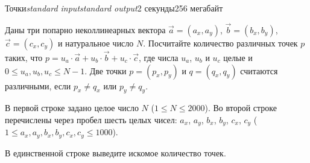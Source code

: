 \begin{problem}{Точки}{\textsl{standard input}}{\textsl{standard output}}{2 секунды}{256 мегабайт}

Даны три попарно неколлинеарных вектора $\vec{a} = (a_x, a_y)$, $\vec{b} = (b_x, b_y)$, $\vec{c} = (c_x, c_y)$ и натуральное число $N$. Посчитайте количество различных точек $p$ таких, что $p = u_a \cdot \vec{a} + u_b \cdot \vec{b} + u_c \cdot \vec{c}$, где числа $u_a$, $u_b$ и $u_c$ целые и $0 \le u_a, u_b, u_c \le N - 1$. Две точки $p = (p_x, p_y)$ и $q = (q_x, q_y)$ считаются различными, если $p_x \ne q_x$ или $p_y \ne q_y$.

\InputFile
В первой строке задано целое число $N$ ($1 \le N \le 2000$). Во второй строке перечислены через пробел шесть целых чисел: $a_x$, $a_y$, $b_x$, $b_y$, $c_x$, $c_y$ ($1 \le a_x, a_y, b_x, b_y, c_x, c_y \le 1000$).

\OutputFile
В единственной строке выведите искомое количество точек.

\Examples

\begin{example}
%
%
%
\end{example}

\end{problem}
